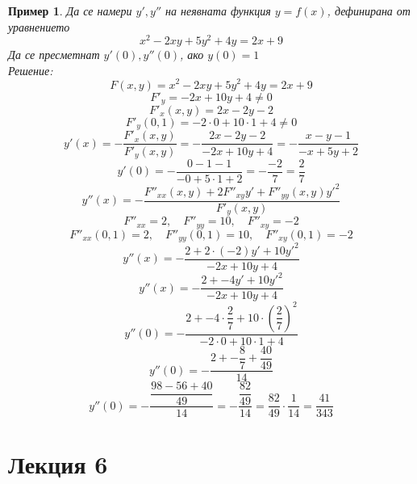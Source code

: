\documentclass[fleqn,12pt]{article}
\newtheorem{example}{Пример}[subsection]
\begin{document}
\begin{example}
Да се намери $y', y''$ на неявната функция $y = f(x)$, дефинирана от уравнението 
$$x^2 - 2xy + 5y^2 + 4y = 2x + 9$$
Да се пресметнат $y'(0), y''(0)$, ако $y(0) = 1$ \\
Решение: 
$$F(x,y) = x^2 - 2xy + 5y^2 + 4y = 2x + 9$$
$$F'_y = -2x + 10y + 4 \neq 0$$
$$F'_x(x,y) = 2x - 2y - 2$$
$$F'_y(0,1) = -2 \cdot 0 + 10 \cdot 1 + 4 \neq 0$$
$$y'(x) = - \dfrac{F'_x(x,y)}{F'_y(x,y)} = - \dfrac{2x - 2y - 2}{-2x + 10y + 4} = - \dfrac{x - y - 1}{- x + 5y + 2}$$
$$y'(0) = - \dfrac{0 - 1 - 1}{- 0 + 5 \cdot 1 + 2} = - \dfrac{-2}{7} = \dfrac{2}{7}$$
$$y''(x) = - \dfrac{F''_{xx}(x,y) + 2F''_{xy}y' + F''_{yy}(x,y)y'^2}{F'_y(x,y)}$$
$$F''_{xx} = 2, \quad F''_{yy} = 10, \quad F''_{xy} = -2$$
$$F''_{xx}(0,1) = 2, \quad F''_{yy}(0,1) = 10, \quad F''_{xy}(0,1) = -2$$
$$y''(x) = - \dfrac{2 + 2 \cdot (-2)y' + 10y'^2}{-2x + 10y + 4}$$
$$y''(x) = - \dfrac{2 + - 4y' + 10y'^2}{-2x + 10y + 4}$$
$$y''(0) = - \dfrac{2 + - 4 \cdot \dfrac{2}{7} + 10 \cdot \left( \dfrac{2}{7} \right) ^2}{-2 \cdot 0 + 10 \cdot 1 + 4}$$
$$y''(0) = - \dfrac{2 + - \dfrac{8}{7} + \dfrac{40}{49}}{14}$$
$$y''(0) = - \dfrac{\dfrac{98 - 56 + 40}{49}}{14} = - \dfrac{\dfrac{82}{49}}{14} = \dfrac{82}{49} \cdot \dfrac{1}{14} = \dfrac{41}{343}$$
\end{example}

\newpage

\section{Лекция 6}

\newpage
\end{document}
